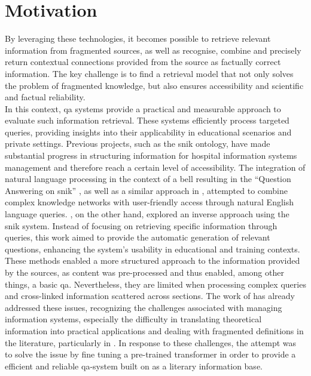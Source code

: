 \section{Motivation}\label{sec:motivation}
By leveraging these technologies, it becomes possible to retrieve relevant information from fragmented sources, as well as recognise, combine and precisely return contextual connections provided from the source as factually correct information. 
The key challenge is to find a retrieval model that not only solves the problem of fragmented knowledge, but also ensures accessibility and scientific and factual reliability.\\ 
In this context, \ac{qa} systems provide a practical and measurable approach to evaluate such information retrieval. 
These systems efficiently process targeted queries, providing insights into their applicability in educational scenarios and private settings.
% 
Previous projects, such as the \ac{snik} ontology, have made substantial progress in structuring information for hospital information systems management and therefore reach a certain level of accessibility. 
The integration of natural language processing in the context of a \ac{bell} resulting in the \enquote{Question Answering on \ac{snik}} \citep{hannesbell, hannesbell_skill}, as well as a similar approach in \citet{snikquiz}, attempted to combine complex knowledge networks with user-friendly access through natural English language queries. \citet{arneba}, on the other hand, explored an inverse approach using the \ac{snik} system. 
Instead of focusing on retrieving specific information through queries, this work aimed to provide the automatic generation of relevant questions, enhancing the system's usability in educational and training contexts.\\
%
These methods enabled a more structured approach to the information provided by the sources, as content was pre-processed and thus enabled, among other things, a basic \ac{qa}. Nevertheless, they are limited when processing complex queries and cross-linked information scattered across sections.
The work of \citet{Paul_Keller} has already addressed these issues, recognizing the challenges associated with managing information systems, especially the difficulty in translating theoretical information into practical applications and dealing with fragmented definitions in the literature, particularly in \citet{bb2}. 
In response to these challenges, the attempt was to solve the issue by fine tuning a pre-trained transformer in order to provide a efficient and reliable \ac{qa}-system built on \citet{bb2} as a literary information base.
